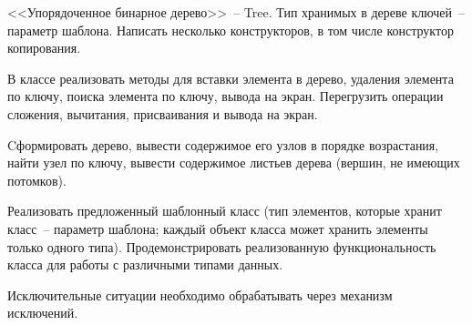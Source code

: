 
<<Упорядоченное бинарное дерево>>~-- Tree. Тип хранимых в дереве ключей~-- параметр
шаблона. Написать несколько конструкторов, в том числе конструктор копирования.

В
классе реализовать методы для вставки элемента в дерево, удаления элемента по ключу,
поиска элемента по ключу, вывода на экран. Перегрузить операции сложения, вычитания,
присваивания и вывода на экран.

Cформировать дерево, вывести содержимое его узлов в
порядке возрастания, найти узел по ключу, вывести содержимое листьев дерева (вершин,
не имеющих потомков).

Реализовать предложенный шаблонный класс (тип элементов, которые
хранит класс~-- параметр шаблона; каждый объект класса может хранить
элементы только одного типа). Продемонстрировать реализованную
функциональность класса для работы с различными типами данных.


Исключительные ситуации необходимо обрабатывать через механизм исключений.
